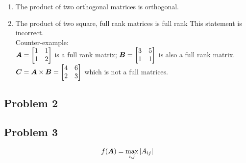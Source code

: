 \documentclass{article}
\begin{document}
\begin{enumerate}
\item The product of two orthogonal matrices is orthogonal.

\item The product of two square, full rank matrices is full rank
This statement is incorrect. \\
Counter-example:\\
$\boldsymbol{A}=\begin{bmatrix} 1&1\\1&2 \end{bmatrix}$ is a full rank matrix; \newline
$\boldsymbol{B}=\begin{bmatrix} 3&5\\1&1 \end{bmatrix}$ is also a full rank matrix.\newline
$\boldsymbol{C} = \boldsymbol{A}\times\boldsymbol{B} = \begin{bmatrix} 4&6\\2&3 \end{bmatrix} $ which is not a full matrices.  \newline


\end{enumerate} 

\hypertarget{problem_2_prove_or_disprove_3}{}
\subsection*{{Problem 2}}
\label{problem_1_prove_or_disprove_3}




\hypertarget{problem_3_prove_or_disprove_3}{}
\subsection*{{Problem 3}}
\label{problem_1_prove_or_disprove_3}

\begin{align} 
f(\boldsymbol{A}) = \max_{i,j}|A_{ij}| 
\end{align} 
\end{document}
